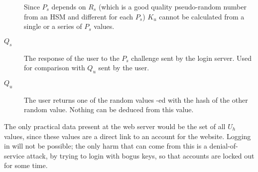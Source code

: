\begin{description}
				Since $P_s$ depends on $R_s$
				(which is a good quality pseudo-random number from an HSM and different for each $P_s$)
				$K_u$ cannot be calculated from a single or a series of $P_s$ values.
\item[$Q_s$]	The response of the user to the $P_s$ challenge sent by the login server.
				Used for comparison with $Q_u$ sent by the user.
\item[$Q_u$]	The user returns one of the random values \XOR-ed with the hash of the other random value.
				Nothing can be deduced from this value.
\end{description}
The only practical data present at the web server would be the set of all $U_h$ values,
since these values are a direct link to an account for the website.
Logging in will not be possible;
the only harm that can come from this is a denial-of-service attack,
by trying to login with bogus keys,
so that accounts are locked out for some time.
